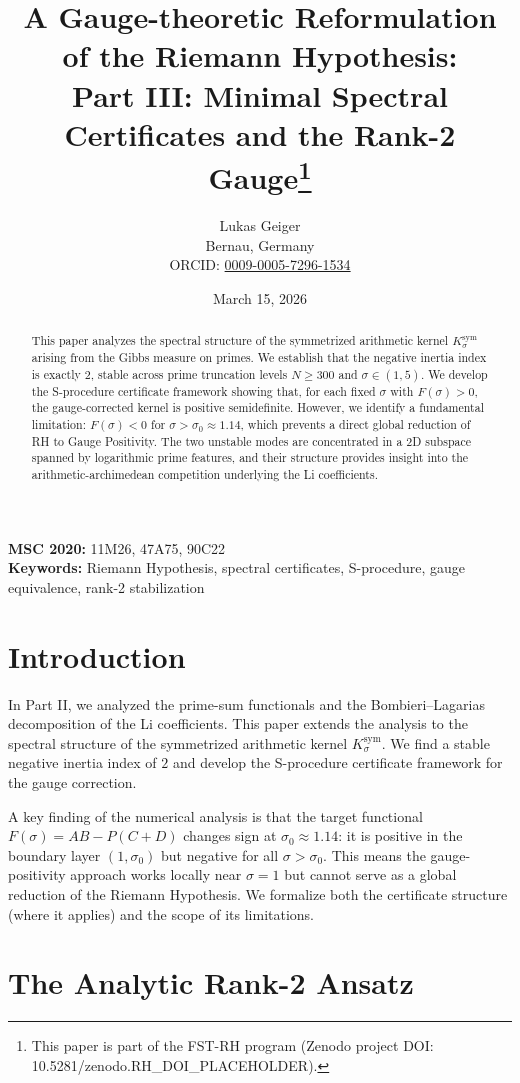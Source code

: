 \documentclass[12pt,a4paper]{article}
\title{A Gauge-theoretic Reformulation of the Riemann Hypothesis:\\ Part III: Minimal Spectral Certificates and the Rank-2 Gauge\thanks{This paper is part of the FST-RH program (Zenodo project DOI: 10.5281/zenodo.RH\_DOI\_PLACEHOLDER).}}
\author{Lukas Geiger\\
\small Bernau, Germany\\
\small ORCID: \href{https://orcid.org/0009-0005-7296-1534}{0009-0005-7296-1534}}
\date{March 15, 2026}
\theoremstyle{definition}
\theoremstyle{remark}
\newcommand{\Ksym}{K_\sigma^{\mathrm{sym}}}
\begin{document}
\maketitle

\begin{abstract}
This paper analyzes the spectral structure of the symmetrized arithmetic kernel $\Ksym$ arising from the Gibbs measure on primes. We establish that the negative inertia index is exactly $2$, stable across prime truncation levels $N \ge 300$ and $\sigma \in (1, 5)$. We develop the S-procedure certificate framework showing that, for each fixed $\sigma$ with $F(\sigma) > 0$, the gauge-corrected kernel is positive semidefinite. However, we identify a fundamental limitation: $F(\sigma) < 0$ for $\sigma > \sigma_0 \approx 1.14$, which prevents a direct global reduction of RH to Gauge Positivity. The two unstable modes are concentrated in a 2D subspace spanned by logarithmic prime features, and their structure provides insight into the arithmetic-archimedean competition underlying the Li coefficients.
\end{abstract}

\noindent\textbf{MSC 2020:} 11M26, 47A75, 90C22\\
\textbf{Keywords:} Riemann Hypothesis, spectral certificates, S-procedure, gauge equivalence, rank-2 stabilization

\tableofcontents

\section{Introduction}

In Part II, we analyzed the prime-sum functionals and the Bombieri--Lagarias decomposition of the Li coefficients. This paper extends the analysis to the spectral structure of the symmetrized arithmetic kernel $\Ksym$. We find a stable negative inertia index of $2$ and develop the S-procedure certificate framework for the gauge correction.

A key finding of the numerical analysis is that the target functional $F(\sigma) = AB - P(C+D)$ changes sign at $\sigma_0 \approx 1.14$: it is positive in the boundary layer $(1, \sigma_0)$ but negative for all $\sigma > \sigma_0$. This means the gauge-positivity approach works locally near $\sigma = 1$ but cannot serve as a global reduction of the Riemann Hypothesis. We formalize both the certificate structure (where it applies) and the scope of its limitations.

\section{The Analytic Rank-2 Ansatz}
\end{document}
